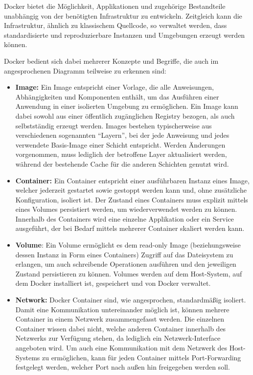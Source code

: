 \documentclass[a4paper,12pt,twoside]{scrreprt}
\begin{document}
Docker bietet die Möglichkeit, Applikationen und zugehörige Bestandteile unabhängig von der benötigten Infrastruktur zu entwickeln. Zeitgleich kann die Infrastruktur, ähnlich zu klassischem Quellcode, so verwaltet werden, dass standardisierte und reproduzierbare Instanzen und Umgebungen erzeugt werden können. \cite{docker_inc_docker_2023}

Docker bedient sich dabei mehrerer Konzepte und Begriffe, die auch im angesprochenen Diagramm teilweise zu erkennen sind:
\begin{itemize}
    \item \textbf{Image:} Ein Image entspricht einer Vorlage, die alle Anweisungen, Abhängigkeiten und Komponenten enthält, um das Ausführen einer Anwendung in einer isolierten Umgebung zu ermöglichen. Ein Image kann dabei sowohl aus einer öffentlich zugänglichen Registry bezogen, als auch selbstständig erzeugt werden. Images bestehen typischerweise aus verschiedenen sogenannten \enquote{Layern}, bei der jede Anweisung und jedes verwendete Basis-Image einer Schicht entspricht. Werden Änderungen vorgenommen, muss lediglich der betroffene Layer aktualisiert werden, während der bestehende Cache für die anderen Schichten genutzt wird. \cite{docker_inc_docker_2023, montemagno_docker_2023}
    \item \textbf{Container:} Ein Container entspricht einer ausführbaren Instanz eines Image, welcher jederzeit gestartet sowie gestoppt werden kann und, ohne zusätzliche Konfiguration, isoliert ist. Der Zustand eines Containers muss explizit mittels eines Volumes persistiert werden, um wiederverwendet werden zu können. Innerhalb des Containers wird eine einzelne Applikation oder ein Service ausgeführt, der bei Bedarf mittels mehrerer Container skaliert werden kann. \cite{docker_inc_docker_2023, montemagno_docker_2023}
    \item \textbf{Volume}: Ein Volume ermöglicht es dem read-only Image (beziehungsweise dessen Instanz in Form eines Containers)  Zugriff auf das Dateisystem zu erlangen, um auch schreibende Operationen ausführen und den jeweiligen Zustand persistieren zu können. Volumes werden auf dem Host-System, auf dem Docker installiert ist, gespeichert und von Docker verwaltet. \cite{montemagno_docker_2023}
    \item \textbf{Network:} Docker Container sind, wie angesprochen, standardmäßig isoliert. Damit eine Kommunikation untereinander möglich ist, können mehrere Container in einem Netzwerk zusammengefasst werden. Die einzelnen Container wissen dabei nicht, welche anderen Container innerhalb des Netzwerks zur Verfügung stehen, da lediglich ein Netzwerk-Interface angeboten wird. Um auch eine Kommunikation mit dem Netzwerk des Host-Systems zu ermöglichen, kann für jeden Container mittels Port-Forwarding festgelegt werden, welcher Port nach außen hin freigegeben werden soll. \cite{docker_inc_networking_overview_2023}
\end{itemize}
\end{document}
